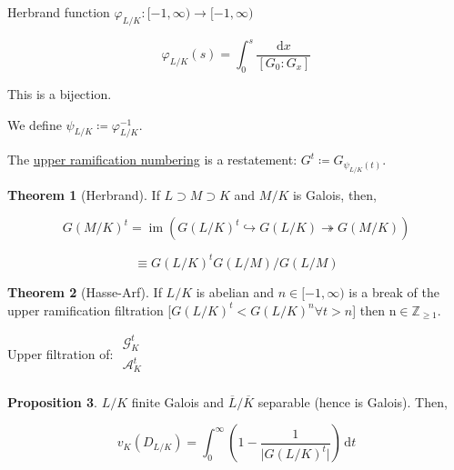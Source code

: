 \documentclass{article}
\theoremstyle{definition}
\newtheorem{theorem}{Theorem}
\numberwithin{theorem}{subsection}
\newtheorem{proposition}[theorem]{Proposition}
\begin{document}
    Herbrand function \(\varphi_{L / K}: [-1,\infty) \to [-1, \infty)\)

    \[
        \varphi_{L / K}(s) = \int_{0}^{s} \frac{\mathrm{d} x}{[G_0 : G_x]} 
    \]

    This is a bijection.

    We define \(\psi_{L / K} \coloneqq \varphi_{L / K} ^{-1}\).

    The \underline{upper ramification numbering} is a restatement: \(G^t \coloneqq G_{\psi_{L / K}(t)}\).
    
    \begin{theorem}
        [Herbrand] If \(L \supset M \supset K\) and \(M / K\) is Galois, then,

        \[
            G(M / K)^t = \operatorname{im} (G(L / K)^t \hookrightarrow G(L / K) \twoheadrightarrow G(M / K))
        \]

        \[
            \equiv  G(L / K)^t G(L / M) / G(L / M)
        \]
    \end{theorem}

    \begin{theorem}
        [Hasse-Arf] If \(L / K\) is abelian and \(n \in [-1,\infty)\) is a break of the upper ramification filtration [\(G(L / K)^t < G(L / K)^n \forall t > n\)] then n\(\in \mathbb{Z}_{\geq 1}\).
    \end{theorem}

    Upper filtration of: \(\begin{matrix}
        \mathscr{G}_K^t \\
        \mathscr{A}_K^t \\
    \end{matrix} \) 

    \begin{proposition}
        \(L / K\) finite Galois and \(\overline{L} / \overline{K} \) separable (hence is Galois). Then,

        \[
            v_K(D_{L / K}) = \int_{0}^{\infty} \left( 1 - \frac{1}{\vert G(L / K)^t \vert } \right)  \,\mathrm{d}t 
        \]
    \end{proposition}
\end{document}
